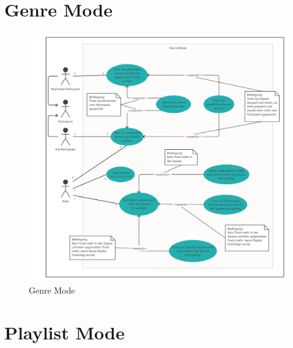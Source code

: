 \documentclass[oneside, ngerman]{sdqtechreport}
\begin{document}
\newpage

\section{Genre Mode}
\label{sec:Anwendungsfälle:Genre Mode}

\begin{figure}[h]
    \includegraphics[width = 16cm]{LATEX/Pflichtenheft/GraphicDesigns/Use Case Genre Mode.png}
    \caption{Genre Mode}
    \label{fig:Use Case Genre Mode}
\end{figure}

\newpage

\section{Playlist Mode}
\label{sec:Anwendungsfälle:Playlist Mode}
\end{document}
